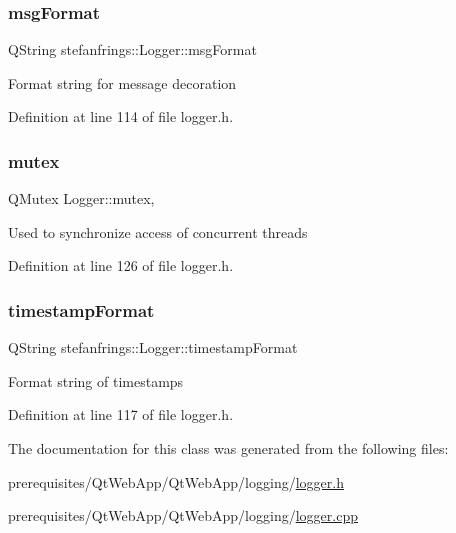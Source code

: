 \mbox{\label{classstefanfrings_1_1_logger_ab7dada738f69e822329edd76889bb758}} 
\subsubsection{\texorpdfstring{msg\+Format}{msgFormat}}
{\footnotesize\ttfamily Q\+String stefanfrings\+::\+Logger\+::msg\+Format\hspace{0.3cm}{\ttfamily [protected]}}

Format string for message decoration 

Definition at line 114 of file logger.\+h.

\mbox{\label{classstefanfrings_1_1_logger_a724e09b39b88c5a880f2405a260949cb}} 
\subsubsection{\texorpdfstring{mutex}{mutex}}
{\footnotesize\ttfamily Q\+Mutex Logger\+::mutex\hspace{0.3cm}{\ttfamily [static]}, {\ttfamily [protected]}}

Used to synchronize access of concurrent threads 

Definition at line 126 of file logger.\+h.

\mbox{\label{classstefanfrings_1_1_logger_a04eed4523912a75a31d75589f9eb81db}} 
\subsubsection{\texorpdfstring{timestamp\+Format}{timestampFormat}}
{\footnotesize\ttfamily Q\+String stefanfrings\+::\+Logger\+::timestamp\+Format\hspace{0.3cm}{\ttfamily [protected]}}

Format string of timestamps 

Definition at line 117 of file logger.\+h.



The documentation for this class was generated from the following files\+:\begin{DoxyCompactItemize}
\item 
prerequisites/\+Qt\+Web\+App/\+Qt\+Web\+App/logging/\mbox{\hyperlink{_qt_web_app_2_qt_web_app_2logging_2logger_8h}{logger.\+h}}\item 
prerequisites/\+Qt\+Web\+App/\+Qt\+Web\+App/logging/\mbox{\hyperlink{logger_8cpp}{logger.\+cpp}}\end{DoxyCompactItemize}
